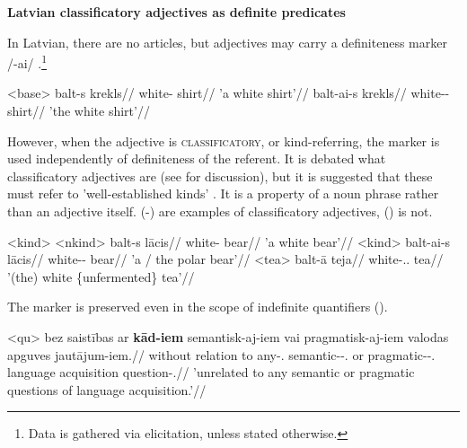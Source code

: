 \documentclass[a4paper, 12pt]{article}
\begin{document}
\begin{sloppypar}


\textbf{Latvian classificatory adjectives as definite predicates}

In Latvian, there are no articles, but adjectives may carry a definiteness marker /-ai/ \citep[160]{kalnaca2021}.\footnote{Data is gathered via elicitation, unless stated otherwise.}

\pex<base>
    \a \begingl
        \gla balt-s krekls//
        \glb white-\Nom{} shirt//
        \glft 'a white shirt'//
    \endgl
    \a \begingl
        \gla balt-ai-s krekls//
        \glb white-\Def{}-\Nom{} shirt//
        \glft 'the white shirt'//
    \endgl
\xe

However, when the adjective is \textsc{classificatory}, or kind-referring, the marker is used independently of definiteness of the referent. It is debated what classificatory adjectives are (see \citep[48]{morzycki2016} for discussion), but it is suggested that these must refer to 'well-established kinds' \citep{trugman2005}. It is a property of a noun phrase rather than an adjective itself. (-) are examples of classificatory adjectives, () is not.

\pex<kind>
    \a<nkind> \begingl
        \gla balt-s lācis//
        \glb white-\Nom{} bear//
        \glft 'a white bear'//
    \endgl 
    \a<kind> \begingl
        \gla balt-ai-s lācis//
        \glb white-\Def{}-\Nom{} bear//
        \glft 'a / the polar bear'//
    \endgl
    \a<tea> \begingl
        \gla balt-ā teja//
        \glb white-\F.\Def{}.\Nom{} tea//
        \glft '(the) white \{unfermented\} tea'//
    \endgl
\xe


The marker is preserved even in the scope of indefinite quantifiers (\nextx).

\ex<qu> \begingl
        \gla bez saistības ar \textbf{kād-iem} semantisk-aj-iem vai pragmatisk-aj-iem valodas apguves jautājum-iem.//
        \glb without relation to any-\Pl.\Dat{} semantic-\Def-\Pl.\Dat{} or pragmatic-\Def-\Pl.\Dat{} language acquisition question-\Pl.\Dat{}//
        \glft 'unrelated to any semantic or pragmatic questions of language acquisition.'//
    \endgl
\xe


\end{sloppypar}
\end{document}
